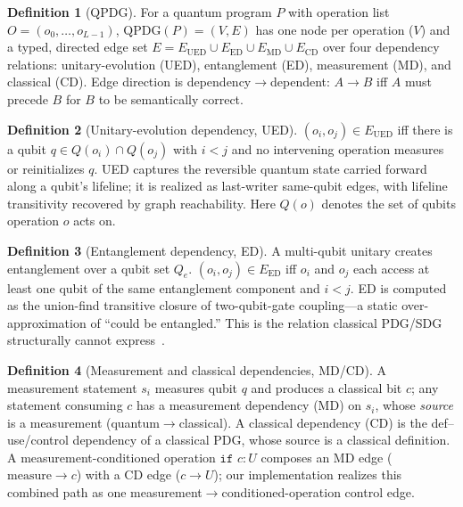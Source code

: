\documentclass[10pt,conference]{IEEEtran}
\theoremstyle{definition}
\newtheorem{definition}{Definition}
\begin{document}
\begin{definition}[QPDG]
For a quantum program $P$ with operation list $O=(o_0,\dots,o_{L-1})$, $\mathrm{QPDG}(P)=(V,E)$ has one node per operation ($V$) and a typed, directed edge set $E = E_{\mathrm{UED}}\cup E_{\mathrm{ED}}\cup E_{\mathrm{MD}}\cup E_{\mathrm{CD}}$ over four dependency relations: unitary-evolution (UED), entanglement (ED), measurement (MD), and classical (CD). Edge direction is dependency$\to$dependent: $A\to B$ iff $A$ must precede $B$ for $B$ to be semantically correct.
\end{definition}

\begin{definition}[Unitary-evolution dependency, UED]
$(o_i,o_j)\in E_{\mathrm{UED}}$ iff there is a qubit $q\in Q(o_i)\cap Q(o_j)$ with $i<j$ and no intervening operation measures or reinitializes $q$. UED captures the reversible quantum state carried forward along a qubit's lifeline; it is realized as last-writer same-qubit edges, with lifeline transitivity recovered by graph reachability. Here $Q(o)$ denotes the set of qubits operation $o$ acts on.
\end{definition}

\begin{definition}[Entanglement dependency, ED]
A multi-qubit unitary creates entanglement over a qubit set $Q_e$. $(o_i,o_j)\in E_{\mathrm{ED}}$ iff $o_i$ and $o_j$ each access at least one qubit of the same entanglement component and $i<j$. ED is computed as the union-find transitive closure of two-qubit-gate coupling---a static over-approximation of ``could be entangled.'' This is the relation classical PDG/SDG structurally cannot express~\cite{ferrante1987pdg, horwitz1990interprocedural}.
\end{definition}

\begin{definition}[Measurement and classical dependencies, MD/CD]
A measurement statement $s_i$ measures qubit $q$ and produces a classical bit $c$; any statement consuming $c$ has a measurement dependency (MD) on $s_i$, whose \emph{source} is a measurement (quantum$\to$classical). A classical dependency (CD) is the def--use/control dependency of a classical PDG, whose source is a classical definition. A measurement-conditioned operation $\texttt{if } c\!:\!U$ composes an MD edge ($\text{measure}\to c$) with a CD edge ($c\to U$); our implementation realizes this combined path as one measurement$\to$conditioned-operation control edge.
\end{definition}
\end{document}
